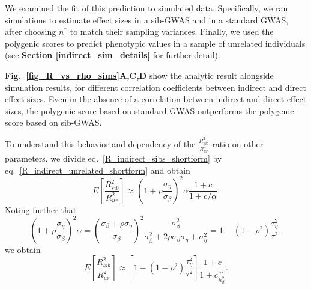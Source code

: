 \documentclass[hidelinks, 12pt]{article}
\begin{document}
We examined the fit of this prediction to simulated data.  Specifically, we ran simulations to estimate effect sizes in a sib-GWAS and in a standard GWAS, after choosing $n^*$ to match their sampling variances.  Finally, we used the polygenic scores to predict phenotypic values in a sample of unrelated individuals (see {\bf Section \ref{indirect_sim_details}} for further detail).

{\bf Fig.~\ref{fig_R_vs_rho_sims}A,C,D} show the analytic result alongside simulation results, for different correlation coefficients between indirect and direct effect sizes.  Even in the absence of a correlation between indirect and direct effect sizes, the polygenic score based on standard GWAS outperforms the polygenic score based on sib-GWAS.  

To understand this behavior and dependency of the $\frac{R_{sib}^2}{R_{ur}^2}$ ratio on other parameters, we divide eq.~\ref{R_indirect_sibs_shortform} by eq.~\ref{R_indirect_unrelated_shortform} and obtain
$$E[\frac{R_{sib}^2}{R_{ur}^2}] \approx \left(1+\rho \frac{\sigma_{\eta}}{\sigma_{\beta}}\right)^{2}\alpha \frac{1+c}{1+c/\alpha}.$$
Noting further that
$$\left(1+\rho \frac{\sigma_{\eta}}{\sigma_{\beta}}\right)^{2} \alpha=\left(\frac{\sigma_\beta+\rho \sigma_\eta}{\sigma_\beta}\right)^{2} \frac{\sigma_\beta^{2}}{\sigma_\beta^{2}+2 \rho \sigma_{\beta} \sigma_{\eta}+\sigma_{\eta}^{2}}=1-(1-\rho^2)\frac{\tau_\eta^2}{\tau^2},$$
we obtain
\begin{equation}
\label{R2_ratio}
E[\frac{R_{sib}^2}{R_{ur}^2}] \approx [ 1-(1-\rho^2) \frac{\tau_\eta^2}{\tau^2}]\frac{1+c}{1+c\frac{\tau^2}{h_\beta^2}}.
\end{equation}
\end{document}
